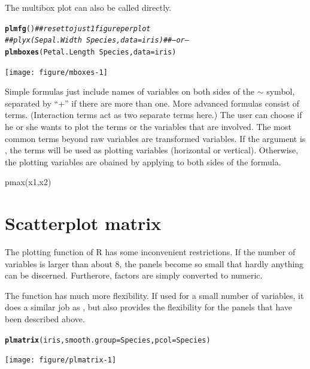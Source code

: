 \documentclass[11pt]{article}\usepackage[]{graphicx}\usepackage[]{color}
\makeatletter
\newcommand{\hlcom}[1]{\textcolor[rgb]{0.678,0.584,0.686}{\textit{#1}}}%
\newcommand{\hlopt}[1]{\textcolor[rgb]{0,0,0}{#1}}%
\newcommand{\hlstd}[1]{\textcolor[rgb]{0.345,0.345,0.345}{#1}}%
\newcommand{\hlkwc}[1]{\textcolor[rgb]{0.333,0.667,0.333}{#1}}%
\newcommand{\hlkwd}[1]{\textcolor[rgb]{0.737,0.353,0.396}{\textbf{#1}}}%
\newenvironment{kframe}{%
 \def\at@end@of@kframe{}%
 \ifinner\ifhmode%
  \def\at@end@of@kframe{\end{minipage}}%
  \begin{minipage}{\columnwidth}%
 \fi\fi%
 \def\FrameCommand##1{\hskip\@totalleftmargin \hskip-\fboxsep
 \colorbox{shadecolor}{##1}\hskip-\fboxsep
     \hskip-\linewidth \hskip-\@totalleftmargin \hskip\columnwidth}%
 \MakeFramed {\advance\hsize-\width
   \@totalleftmargin\z@ \linewidth\hsize
   \@setminipage}}%
 {\par\unskip\endMakeFramed%
 \at@end@of@kframe}
\newenvironment{knitrout}{}{} %
\makeatother
\begin{document}
The multibox plot can also be called directly.
\begin{knitrout}
\color{fgcolor}\begin{kframe}
\begin{alltt}
\hlkwd{plmfg}\hlstd{()}  \hlcom{## reset to just 1 figure per plot}
\hlcom{## plyx(Sepal.Width~Species, data=iris)  ## -- or --}
\hlkwd{plmboxes}\hlstd{(Petal.Length}\hlopt{~}\hlstd{Species,} \hlkwc{data}\hlstd{=iris)}
\end{alltt}
\end{kframe}
\texttt{[image: figure/mboxes-1]} 

\end{knitrout}


Simple formulas just include names of variables on both sides of the $\sim$
symbol, separated by ``+'' if there are more than one. 
More advanced formulas consist of terms.
(Interaction terms act as two separate terms here.)
The user can choose if he or she wants to plot the terms or the variables
that are involved. 
The most common terms beyond raw variables are transformed variables.
If the argument  is , the terms will be used as
plotting variables (horizontal or vertical). 
Otherwise, the plotting variables are obained by applying  to
both sides of the formula.


pmax(x1,x2)


\section{Scatterplot matrix}
The  plotting function of R has some inconvenient restrictions.
If the number of variables is larger than about 8, the panels become so
small that hardly anything can be discerned. Furtherore, factors are simply 
converted to numeric.

The function  has much more flexibility. 
If used for a small number of variables, it does a similar job as 
, but also provides the flexibility for the panels that have been
described above.

\begin{knitrout}
\color{fgcolor}\begin{kframe}
\begin{alltt}
\hlkwd{plmatrix}\hlstd{(iris,} \hlkwc{smooth.group}\hlstd{=Species,} \hlkwc{pcol}\hlstd{=Species)}
\end{alltt}
\end{kframe}
\texttt{[image: figure/plmatrix-1]} 

\end{knitrout}
\end{document}
